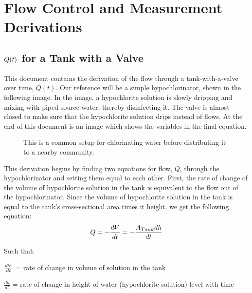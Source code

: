 \documentclass[letterpaper,10pt,english]{sphinxmanual}
\let\sphinxpxdimen\pdfpxdimen\else\newdimen\sphinxpxdimen
\begin{document}
\chapter{Flow Control and Measurement Derivations}
\label{\detokenize{Flow_Control_and_Measurement/FCM_Derivations:flow-control-and-measurement-derivations}}\label{\detokenize{Flow_Control_and_Measurement/FCM_Derivations:title-flow-control-derivations}}\label{\detokenize{Flow_Control_and_Measurement/FCM_Derivations::doc}}

\section{\protect\(Q(t)\protect\) for a Tank with a Valve}
\label{\detokenize{Flow_Control_and_Measurement/FCM_Derivations:for-a-tank-with-a-valve}}\label{\detokenize{Flow_Control_and_Measurement/FCM_Derivations:heading-flow-for-a-tank-with-a-valve}}
This document contains the derivation of the flow through a tank-with-a-valve over time, \(Q(t)\). Our reference will be a simple hypochlorinator, shown in the following image. In the image, a hypochlorite solution is slowly dripping and mixing with piped source water, thereby disinfecting it. The valve is almost closed to make sure that the hypochlorite solution drips instead of flows. At the end of this document is an image which shows the variables in the final equation.

\begin{figure}[htbp]
\centering
\capstart

\noindent\sphinxincludegraphics[width=600\sphinxpxdimen]{{drip_hypochlorinator}.png}
\caption{This is a common setup for chlorinating water before distributing it to a nearby community.}\label{\detokenize{Flow_Control_and_Measurement/FCM_Derivations:id1}}\label{\detokenize{Flow_Control_and_Measurement/FCM_Derivations:figure-drip-hypochlorinator}}\end{figure}

This derivation begins by finding two equations for flow, \(Q\), through the hypochlorinator and setting them equal to each other. First, the rate of change of the volume of hypochlorite solution in the tank is equivalent to the flow out of the hypochlorinator. Since the volume of hypochlorite solution in the tank is equal to the tank’s cross-sectional area times it height, we get the following equation:
\begin{equation}\label{equation:Flow_Control_and_Measurement/FCM_Derivations:Flow_Control_and_Measurement/FCM_Derivations:0}
\begin{split}Q =  - \frac{d\rlap{-}V}{dt} = - \frac{{A_{Tank}}dh}{dt}\end{split}
\end{equation}
\begin{DUlineblock}{0em}
\item[] Such that:
\item[] \(\frac{d\rlap{-}V}{dt}\) = rate of change in volume of solution in the tank
\item[] \(\frac{dh}{dt}\) = rate of change in height of water (hypochlorite solution) level with time
\end{DUlineblock}
\end{document}
